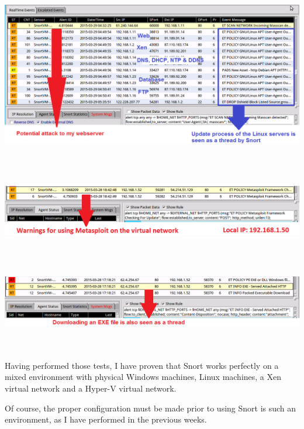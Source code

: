 \documentclass[11pt, a4paper]{article}
\begin{document}
\noindent\begin{minipage}{\textwidth}
    \centering
    \includegraphics[width=\textwidth]{Random_1.png}
\end{minipage}
$\;$ \\ \\
\noindent\begin{minipage}{\textwidth}
    \centering
    \includegraphics[width=\textwidth]{Metasploit_1.png}
\end{minipage}
$\;$ \\ \\
\noindent\begin{minipage}{\textwidth}
    \centering
    \includegraphics[width=\textwidth]{Exe.png}
\end{minipage}
$\;$ \\ \\
Having performed those tests, I have proven that Snort works perfectly on a mixed environment with physical Windows machines, Linux machines, a Xen virtual network and a Hyper-V virtual network.

Of course, the proper configuration must be made prior to using Snort is such an environment, as I have performed in the previous weeks.
\end{document}
